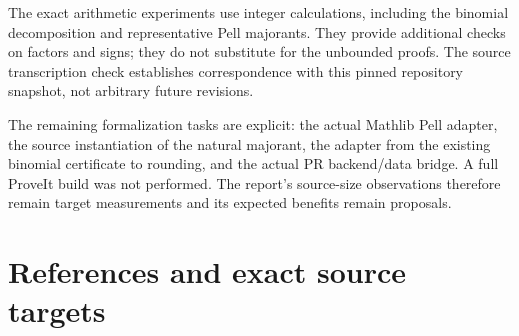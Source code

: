 \documentclass[11pt,a4paper]{article}
\begin{document}
The exact arithmetic experiments use integer calculations, including the
binomial decomposition and representative Pell majorants. They provide
additional checks on factors and signs; they do not substitute for the
unbounded proofs. The source transcription check establishes correspondence
with this pinned repository snapshot, not arbitrary future revisions.

The remaining formalization tasks are explicit: the actual Mathlib Pell
adapter, the source instantiation of the natural majorant, the adapter from
the existing binomial certificate to rounding, and the actual PR backend/data bridge. A full ProveIt
build was not performed. The report's source-size observations therefore
remain target measurements and its expected benefits remain proposals.

\section{References and exact source targets}
\end{document}
